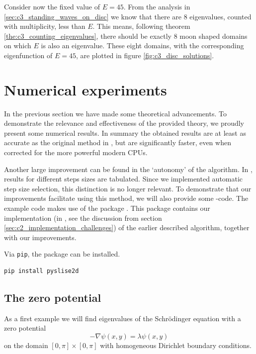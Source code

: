 Consider now the fixed value of $E = 45$. From the analysis in \ref{sec:c3_standing_waves_on_disc} we know that there are $8$ eigenvalues, counted with multiplicity, less than $E$. This means, following theorem \ref{the:c3_counting_eigenvalues}, there should be exactly $8$ moon shaped domains on which $E$ is also an eigenvalue. These eight domains, with the corresponding eigenfunction of $E = 45$, are plotted in figure \ref{fig:c3_disc_solutions}.

\section{Numerical experiments}\label{sec:c3_experiments}

In the previous section we have made some theoretical advancements. To demonstrate the relevance and effectiveness of the provided theory, we proudly present some numerical results. In summary the obtained results are at least as accurate as the original method in \cite{ixaru_new_2010}, but are significantly faster, even when corrected for the more powerful modern CPUs.

Another large improvement can be found in the `autonomy' of the algorithm. In \cite{ixaru_new_2010}, results for different steps sizes are tabulated. Since we implemented automatic step size selection, this distinction is no longer relevant. To demonstrate that our improvements facilitate using this method, we will also provide some \lpython{}-code. The example code makes use of the package \pyslisetd{}. This package contains our implementation (in \cpp{}, see the discussion from section \ref{sec:c2_implementation_challenges}) of the earlier described algorithm, together with our improvements.

Via \texttt{pip}, the package \pyslisetd{} can be installed.
\begin{verbatim}
pip install pyslise2d
\end{verbatim}

\subsection{The zero potential}\label{sec:c3_experiments_zero}

As a first example we will find eigenvalues of the Schrödinger equation with a zero potential
$$
  -\nabla \psi(x, y) = \lambda \psi(x, y)
$$
on the domain $[0, \pi] \times [0, \pi]$ with homogeneous Dirichlet boundary conditions.

